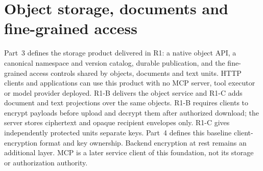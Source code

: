\section{Object storage, documents and fine-grained access}\label{sec:content}
Part~3 defines the storage product delivered in R1: a native object API, a canonical namespace and version catalog, durable publication, and the fine-grained access controls shared by objects, documents and text units. HTTP clients and applications can use this product with no MCP server, tool executor or model provider deployed. R1-B delivers the object service and R1-C adds document and text projections over the same objects. R1-B requires clients to encrypt payloads before upload and decrypt them after authorized download; the server stores ciphertext and opaque recipient envelopes only. R1-C gives independently protected units separate keys. Part~4 defines this baseline client-encryption format and key ownership. Backend encryption at rest remains an additional layer. MCP is a later service client of this foundation, not its storage or authorization authority.

